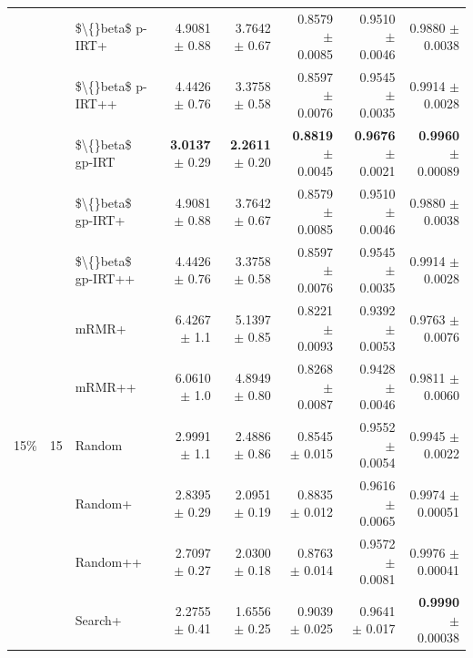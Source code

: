 \begin{longtable}{llp{}rrrrr}
 &  & \$\textbackslash\{\}beta\$ p-IRT+ & 4.9081 {\scriptsize $\pm$ 0.88} & 3.7642 {\scriptsize $\pm$ 0.67} & 0.8579 {\scriptsize $\pm$ 0.0085} & 0.9510 {\scriptsize $\pm$ 0.0046} & 0.9880 {\scriptsize $\pm$ 0.0038} \\
 &  & \$\textbackslash\{\}beta\$ p-IRT++ & 4.4426 {\scriptsize $\pm$ 0.76} & 3.3758 {\scriptsize $\pm$ 0.58} & 0.8597 {\scriptsize $\pm$ 0.0076} & 0.9545 {\scriptsize $\pm$ 0.0035} & 0.9914 {\scriptsize $\pm$ 0.0028} \\
 &  & \$\textbackslash\{\}beta\$ gp-IRT & \textbf{3.0137} {\scriptsize $\pm$ 0.29} & \textbf{2.2611} {\scriptsize $\pm$ 0.20} & \textbf{0.8819} {\scriptsize $\pm$ 0.0045} & \textbf{0.9676} {\scriptsize $\pm$ 0.0021} & \textbf{0.9960} {\scriptsize $\pm$ 0.00089} \\
 &  & \$\textbackslash\{\}beta\$ gp-IRT+ & 4.9081 {\scriptsize $\pm$ 0.88} & 3.7642 {\scriptsize $\pm$ 0.67} & 0.8579 {\scriptsize $\pm$ 0.0085} & 0.9510 {\scriptsize $\pm$ 0.0046} & 0.9880 {\scriptsize $\pm$ 0.0038} \\
 &  & \$\textbackslash\{\}beta\$ gp-IRT++ & 4.4426 {\scriptsize $\pm$ 0.76} & 3.3758 {\scriptsize $\pm$ 0.58} & 0.8597 {\scriptsize $\pm$ 0.0076} & 0.9545 {\scriptsize $\pm$ 0.0035} & 0.9914 {\scriptsize $\pm$ 0.0028} \\
 &  & mRMR+ & 6.4267 {\scriptsize $\pm$ 1.1} & 5.1397 {\scriptsize $\pm$ 0.85} & 0.8221 {\scriptsize $\pm$ 0.0093} & 0.9392 {\scriptsize $\pm$ 0.0053} & 0.9763 {\scriptsize $\pm$ 0.0076} \\
 &  & mRMR++ & 6.0610 {\scriptsize $\pm$ 1.0} & 4.8949 {\scriptsize $\pm$ 0.80} & 0.8268 {\scriptsize $\pm$ 0.0087} & 0.9428 {\scriptsize $\pm$ 0.0046} & 0.9811 {\scriptsize $\pm$ 0.0060} \\
\midrule
15\% & 15 & Random & 2.9991 {\scriptsize $\pm$ 1.1} & 2.4886 {\scriptsize $\pm$ 0.86} & 0.8545 {\scriptsize $\pm$ 0.015} & 0.9552 {\scriptsize $\pm$ 0.0054} & 0.9945 {\scriptsize $\pm$ 0.0022} \\
 &  & Random+ & 2.8395 {\scriptsize $\pm$ 0.29} & 2.0951 {\scriptsize $\pm$ 0.19} & 0.8835 {\scriptsize $\pm$ 0.012} & 0.9616 {\scriptsize $\pm$ 0.0065} & 0.9974 {\scriptsize $\pm$ 0.00051} \\
 &  & Random++ & 2.7097 {\scriptsize $\pm$ 0.27} & 2.0300 {\scriptsize $\pm$ 0.18} & 0.8763 {\scriptsize $\pm$ 0.014} & 0.9572 {\scriptsize $\pm$ 0.0081} & 0.9976 {\scriptsize $\pm$ 0.00041} \\
 &  & Search+ & 2.2755 {\scriptsize $\pm$ 0.41} & 1.6556 {\scriptsize $\pm$ 0.25} & 0.9039 {\scriptsize $\pm$ 0.025} & 0.9641 {\scriptsize $\pm$ 0.017} & \textbf{0.9990} {\scriptsize $\pm$ 0.00038} \\

\end{longtable}
